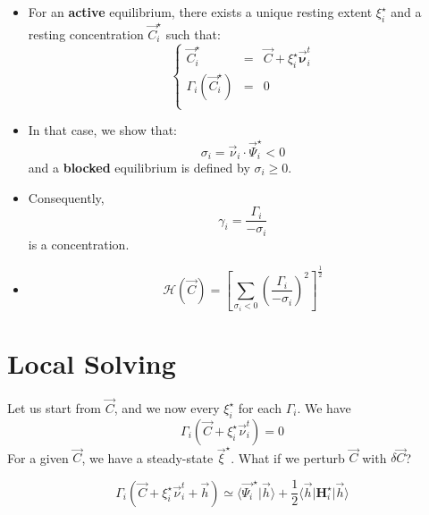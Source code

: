 \documentclass[aps,12pt]{revtex4}
\begin{document}
\begin{itemize}
\item For an {\bf active} equilibrium, there exists a unique resting extent $\xi_i^\star$ and a resting concentration $\vec{C}_i^\star$ such that:
\begin{equation}
\left\lbrace
\begin{array}{rcl}
	\vec{C}_i^\star & = & \vec{C} + \xi_i^\star \vec{\bm{\nu}}^t_i\\
	\Gamma_i(\vec{C}_i^\star) & = & 0 \\
\end{array}
\right.
\end{equation}

\item In that case, we show that:
\begin{equation}
	\sigma_i = \vec{\nu}_i \cdot \vec{\Psi}_i^\star < 0
\end{equation}	
and a {\bf blocked} equilibrium is defined by $\sigma_i\geq 0$.

\item Consequently,
\begin{equation}
	\gamma_i = \dfrac{\Gamma_i}{-\sigma_i} 
\end{equation}
is a concentration.

\item \begin{equation}
\mathcal{H}(\vec{C}) = \left\lbrack\sum_{\sigma_i<0} \left(\dfrac{\Gamma_i}{-\sigma_i}\right)^2 \right\rbrack^{\frac{1}{2}}
\end{equation}

 
\end{itemize}
 
 
 
\section{Local Solving}

Let us start from $\vec{C}$, and we now every $\xi_i^\star$ for each $\Gamma_i$.
We have
\begin{equation}
	\Gamma_i\left(\vec{C} + \xi_i^\star \vec{\nu}^t_i\right) =  0
\end{equation}
For a given $\vec{C}$, we have a steady-state $\vec{\xi}^\star$.
What if we perturb $\vec{C}$ with $\delta\vec{C}$?

\begin{equation}
	\Gamma_i\left( \vec{C} + \xi_i^\star \vec{\nu}^t_i + \vec{h} \right)
	\simeq \langle \vec{\Psi_i}^\star \vert \vec{h} \rangle
	+\dfrac{1}{2} \langle \vec{h} \vert \bm{H}_i^\star \vert \vec{h} \rangle
\end{equation}
 	
\end{document}
